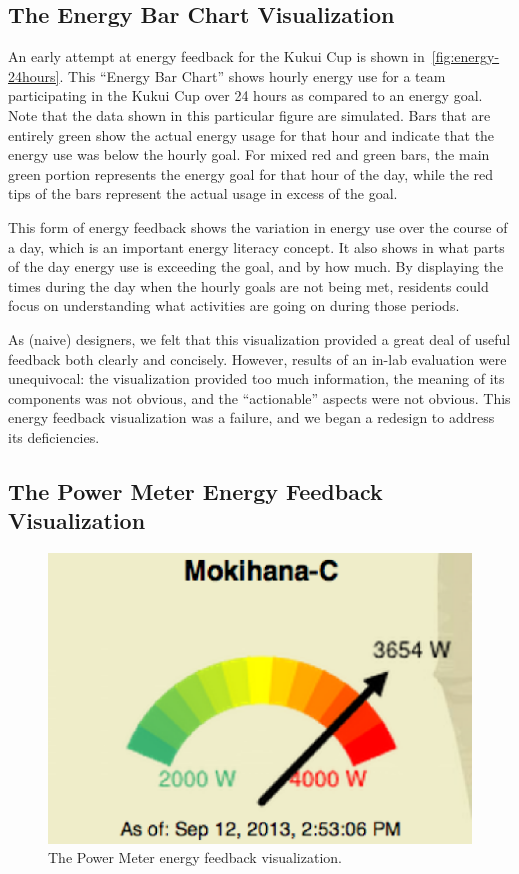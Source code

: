\documentclass[10pt, conference, compsocconf]{IEEEtran-old}
\begin{document}
\subsection{The Energy Bar Chart Visualization}


An early attempt at energy feedback for the Kukui Cup is shown in~\autoref{fig:energy-24hours}. This ``Energy Bar Chart'' shows hourly energy use for a team participating in the Kukui Cup over 24 hours as compared to an energy goal. Note that the data shown in this particular figure are simulated. Bars that are entirely green show the actual energy usage for that hour and indicate that the energy use was below the hourly goal. For mixed red and green bars, the main green portion represents the energy goal for that hour of the day, while the red tips of the bars represent the actual usage in excess of the goal.

This form of energy feedback shows the variation in energy use over the course of a day, which is an important energy literacy concept. It also shows in what parts of the day energy use is exceeding the goal, and by how much. By displaying the times during the day when the hourly goals are not being met, residents could focus on understanding what activities are going on during those periods.

As (naive) designers, we felt that this visualization provided a great deal of useful feedback both clearly and concisely. However, results of an in-lab evaluation were unequivocal: the visualization provided too much information, the meaning of its components was not obvious, and the ``actionable'' aspects were not obvious. This energy feedback visualization was a failure, and we began a redesign to address its deficiencies.

\subsection{The Power Meter Energy Feedback Visualization}

\begin{figure}[!tb]
	\centering
	\includegraphics[width=0.9\columnwidth]{power-meter.eps}
	\caption{The Power Meter energy feedback visualization.}
	\label{fig:power-meter}
\end{figure}
\end{document}
